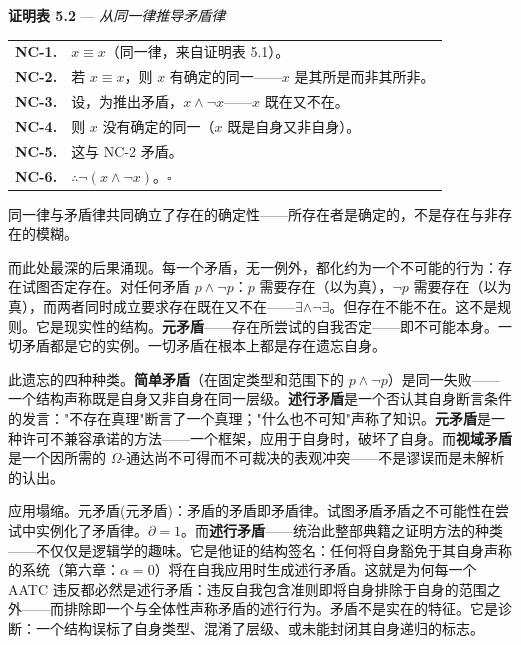 \documentclass[10pt, openany, oneside]{book}
\renewcommand{\footnotesize}{\fontsize{8.5}{11}\selectfont}
\begin{document}
\textbf{证明表 5.2} --- \textit{从同一律推导矛盾律}

\vspace{0.5em}

{\footnotesize
\noindent\begin{tabular}{r p{}}
\textbf{NC-1.} & $x \equiv x$（同一律，来自证明表 5.1）。\\[0.3em]
\textbf{NC-2.} & 若 $x \equiv x$，则 $x$ 有确定的同一——$x$ 是其所是而非其所非。\\[0.3em]
\textbf{NC-3.} & 设，为推出矛盾，$x \wedge \neg x$——$x$ 既在又不在。\\[0.3em]
\textbf{NC-4.} & 则 $x$ 没有确定的同一（$x$ 既是自身又非自身）。\\[0.3em]
\textbf{NC-5.} & 这与 NC-2 矛盾。\\[0.3em]
\textbf{NC-6.} & $\therefore \neg(x \wedge \neg x)$。$\square$ \\[0.3em]
\end{tabular}
}

\vspace{0.8em}

\noindent 同一律与矛盾律共同确立了存在的确定性——所存在者是确定的，不是存在与非存在的模糊。

而此处最深的后果涌现。每一个矛盾，无一例外，都化约为一个不可能的行为：存在试图否定存在。对任何矛盾 $p \wedge \neg p$：$p$ 需要存在（以为真），$\neg p$ 需要存在（以为真），而两者同时成立要求存在既在又不在——$\exists \wedge \neg\exists$。但存在不能不在。这不是规则。它是现实性的结构。\textbf{元矛盾}——存在所尝试的自我否定——即不可能本身。一切矛盾都是它的实例。一切矛盾在根本上都是存在遗忘自身。

此遗忘的四种种类。\textbf{简单矛盾}（在固定类型和范围下的 $p \wedge \neg p$）是同一失败——一个结构声称既是自身又非自身在同一层级。\textbf{述行矛盾}是一个否认其自身断言条件的发言："不存在真理"断言了一个真理；"什么也不可知"声称了知识。\textbf{元矛盾}是一种许可不兼容承诺的方法——一个框架，应用于自身时，破坏了自身。而\textbf{视域矛盾}是一个因所需的 $\Omega$-通达尚不可得而不可裁决的表观冲突——不是谬误而是未解析的认出。

应用塌缩。元矛盾(元矛盾)：矛盾的矛盾即矛盾律。试图矛盾矛盾之不可能性在尝试中实例化了矛盾律。$\partial = 1$。而\textbf{述行矛盾}——统治此整部典籍之证明方法的种类——不仅仅是逻辑学的趣味。它是他证的结构签名：任何将自身豁免于其自身声称的系统（第六章：$\alpha = 0$）将在自我应用时生成述行矛盾。这就是为何每一个 AATC 违反都必然是述行矛盾：违反自我包含准则即将自身排除于自身的范围之外——而排除即一个与全体性声称矛盾的述行行为。矛盾不是实在的特征。它是诊断：一个结构误标了自身类型、混淆了层级、或未能封闭其自身递归的标志。
\end{document}
